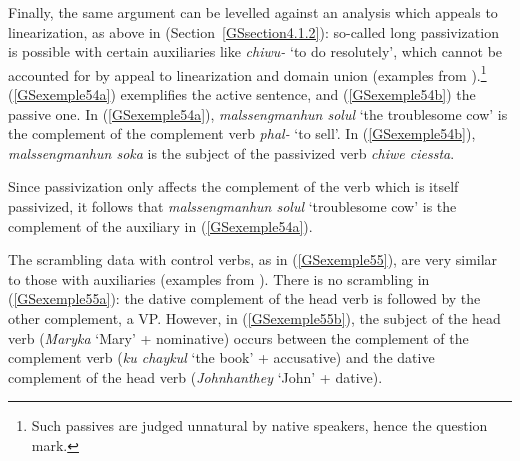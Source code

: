 \zl

\largerpage
Finally, the same argument can be levelled against an analysis which appeals to linearization, as
above in  (Section~\ref{GSsection4.1.2}): so-called long passivization is possible with
certain auxiliaries like \emph{chiwu-} `to do resolutely', which cannot be accounted for by appeal
to linearization and domain union (examples from \citealt[164]{Chung98a-u}).\footnote{Such passives
  are judged unnatural by native speakers, hence the question mark.} (\ref{GSexemple54a})
exemplifies the active sentence, and (\ref{GSexemple54b}) the passive one. In (\ref{GSexemple54a}),
\emph{malssengmanhun solul} `the troublesome cow' is the complement of the complement verb
\emph{phal-} `to sell'. In (\ref{GSexemple54b}), \emph{malssengmanhun soka} is the subject of the
passivized verb \emph{chiwe ciessta}.

\eal
	\label{GSexemple54} 
	\label{GSexemple54a}
		
	\label{GSexemple54b}
\zl

\noindent
Since passivization only affects the complement of the verb which is itself passivized, it follows that \emph{malssengmanhun solul} `troublesome cow' is the complement of the auxiliary in (\ref{GSexemple54a}).

The scrambling data with control verbs, as in (\ref{GSexemple55}), are very similar to those with auxiliaries (examples from \citealt[189--190]{Chung98a-u}). There is no scrambling in (\ref{GSexemple55a}): the dative complement of the head verb is followed
by the other complement, a VP. However, in (\ref{GSexemple55b}), the subject of the head verb
(\emph{Maryka} `Mary' + nominative) occurs between the complement of the complement verb (\emph{ku
  chaykul} `the book' + accusative) and the dative complement of the head verb (\emph{Johnhanthey} `John' + dative).

